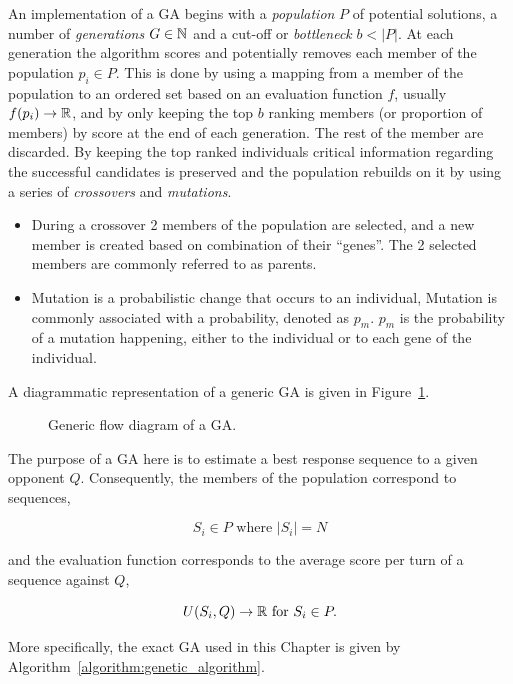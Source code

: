 An implementation of a GA begins with a \textit{population} \(P\) of
potential solutions, a number of \textit{generations} \(G \in \mathbb{N}\) and a cut-off or
\textit{bottleneck} \(b < |P|\). At each generation the algorithm scores and potentially
removes each member of the population \(p_i \in P\). This is done by using a
mapping from a member of the population to an ordered set based on an evaluation
function \(f\), usually \(f(p_i) \to \mathbb{R}\), and by only keeping the top \(b\)
ranking members (or proportion of members) by score at the end of each
generation. The rest of the member are discarded. By keeping the top ranked
individuals critical information regarding the successful candidates is
preserved and the population rebuilds on it by using a series of
\textit{crossovers} and \textit{mutations}.

\begin{itemize}
    \item During a crossover 2 members of the population are selected, and a new
    member is created based on combination of their ``genes''. The 2 selected members
    are commonly referred to as parents.
    \item Mutation is a probabilistic change that occurs to an individual,
    Mutation is commonly associated with a probability, denoted as \(p_m\).
    \(p_m\) is the probability of a mutation happening, either to the individual
    or to each gene of the individual.
\end{itemize}

A diagrammatic representation of a generic GA is given in Figure~\ref{fig:ga_flow_diagram}.

\begin{figure}[!htbp]
    \centering
    
    \caption{Generic flow diagram of a GA.}\label{fig:ga_flow_diagram}
\end{figure}

The purpose of a GA here is to estimate a best response sequence to
a given opponent \(Q\). Consequently, the members of the population correspond to
sequences,

\[S_i \in P \text{ where } |S_i| = N\]

and the evaluation function corresponds to the
average score per turn of a sequence against \(Q\),

\[U(S_i, Q) \to \mathbb{R} \text{ for } S_i \in P.\]

More specifically, the exact GA used in this Chapter is given
by Algorithm~\ref{algorithm:genetic_algorithm}.

